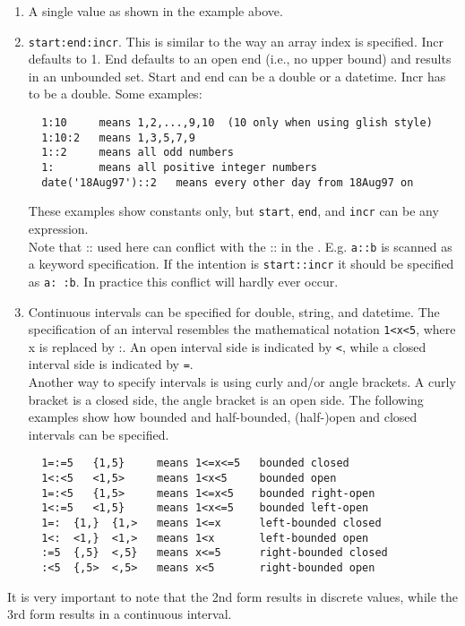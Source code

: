 \begin{enumerate}
\item A single value as shown in the example above.
\item \texttt{start:end:incr}. This is similar to the
way an array index is specified. Incr defaults to 1.
End defaults to an open end (i.e., no upper bound) and results
in an unbounded set. Start and end can be a double or a datetime.
Incr has to be a double. Some examples:
\begin{verbatim}
  1:10     means 1,2,...,9,10  (10 only when using glish style)
  1:10:2   means 1,3,5,7,9
  1::2     means all odd numbers
  1:       means all positive integer numbers
  date('18Aug97')::2   means every other day from 18Aug97 on
\end{verbatim}
These examples show constants only, but \texttt{start}, \texttt{end},
and \texttt{incr} can be any expression.
\\Note that :: used here can conflict with the :: in the
. E.g. \texttt{a::b} is scanned as
a keyword specification. If the intention is \texttt{start::incr}
it should be specified as \texttt{a: :b}. In practice this conflict
will hardly ever occur.
\item Continuous intervals can be specified for double, string, and datetime.
The specification of an interval resembles the mathematical notation
\texttt{1<x<5}, where x is replaced by :. An open interval side
is indicated by \texttt{<}, while a closed interval side is indicated
by \texttt{=}.
\\Another way to specify intervals is using curly and/or angle brackets.
A curly bracket is a closed side, the angle bracket is an open side.
The following examples show how bounded and half-bounded,
(half-)open and closed intervals can be specified.
\begin{verbatim}
  1=:=5   {1,5}     means 1<=x<=5   bounded closed
  1<:<5   <1,5>     means 1<x<5     bounded open
  1=:<5   {1,5>     means 1<=x<5    bounded right-open
  1<:=5   <1,5}     means 1<x<=5    bounded left-open
  1=:  {1,}  {1,>   means 1<=x      left-bounded closed
  1<:  <1,}  <1,>   means 1<x       left-bounded open
  :=5  {,5}  <,5}   means x<=5      right-bounded closed
  :<5  {,5>  <,5>   means x<5       right-bounded open
\end{verbatim}
\end{enumerate}
It is very important to note that the 2nd form results in
discrete values, while the 3rd form results in a continuous interval.

